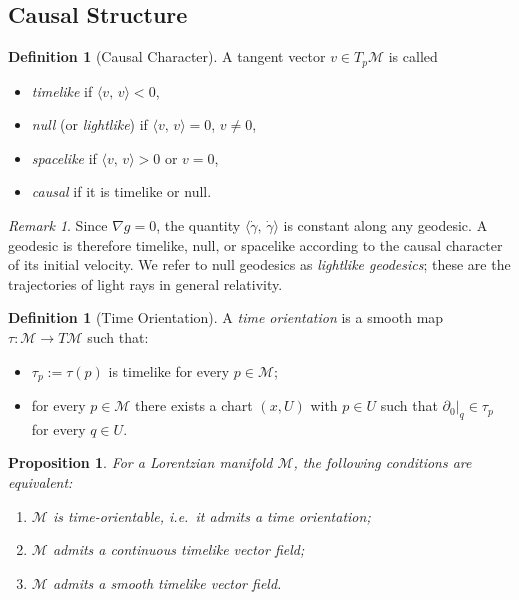 \documentclass[12pt, a4paper]{article}
\theoremstyle{plain}
\newtheorem{proposition}[theorem]{Proposition}
\theoremstyle{definition}
\newtheorem{definition}[theorem]{Definition}
\theoremstyle{remark}
\newtheorem{remark}[theorem]{Remark}
\newcommand{\M}{\mathcal{M}}
\newcommand{\ls}[2]{\langle #1,\, #2 \rangle}
\begin{document}
\subsection{Causal Structure}

\begin{definition}[Causal Character]
  A tangent vector $v \in T_p\M$ is called
  \begin{itemize}
    \item \emph{timelike} if $\ls{v}{v} < 0$,
    \item \emph{null} (or \emph{lightlike}) if $\ls{v}{v} = 0$, $v \neq 0$,
    \item \emph{spacelike} if $\ls{v}{v} > 0$ or $v = 0$,
    \item \emph{causal} if it is timelike or null.
  \end{itemize}
\end{definition}

\begin{remark}
  Since $\nabla g = 0$, the quantity $\ls{\dot{\gamma}}{\dot{\gamma}}$ is
  constant along any geodesic. A geodesic is therefore timelike,
  null, or spacelike according to the causal character of its initial
  velocity. We refer to null geodesics as \emph{lightlike geodesics};
  these are the trajectories of light rays in general relativity.
\end{remark}

\begin{definition}[Time Orientation]
  A \emph{time orientation} is a smooth map $\tau \colon \M \to T\M$ such that:
  \begin{itemize}
    \item $\tau_p := \tau(p)$ is timelike for every $p \in \M$;
    \item for every $p \in \M$ there exists a chart $(x, U)$ with $p \in U$ such that
          $\partial_0\big|_q \in \tau_p$ for every $q \in U$.
  \end{itemize}
\end{definition}

\begin{proposition}
  For a Lorentzian manifold $\M$, the following conditions are equivalent:
  \begin{enumerate}
    \item $\M$ is time-orientable, i.e.\ it admits a time orientation;
    \item $\M$ admits a continuous timelike vector field;
    \item $\M$ admits a smooth timelike vector field.
  \end{enumerate}
\end{proposition}
\end{document}

